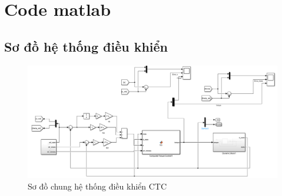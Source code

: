 \chapter{Code matlab}
    \section{Sơ đồ hệ thống điều khiển}
    \begin{figure}[H]
        \centering
        \includegraphics[width=1\textwidth]{pictures/ctc.png}
        \caption{Sơ đồ chung hệ thống điều khiển CTC}
    \end{figure}

